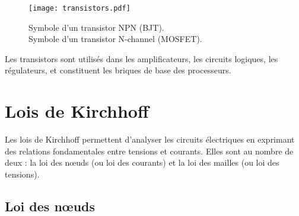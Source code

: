 \begin{figure}[H]
    \centering
    \texttt{[image: transistors.pdf]}
    \caption{\centering\newline
         Symbole d’un transistor NPN (BJT).\\
         Symbole d’un transistor N-channel (MOSFET).
    }
\end{figure}

Les transistors sont utilis\'es dans les amplificateurs,
les circuits logiques, les r\'egulateurs, et constituent les briques de base des processeurs.

\section{Lois de Kirchhoff} \label{subsec:kirchhoff}
Les lois de Kirchhoff permettent d’analyser les circuits \'electriques en exprimant
des relations fondamentales entre tensions et courants. Elles sont au nombre de deux :
la loi des nœuds (ou loi des courants) et la loi des mailles (ou loi des tensions).
\subsection{Loi des n{\oe}uds} \label{subsec:noeuds}
\begin{figure}[H]
    \centering
\end{figure}

